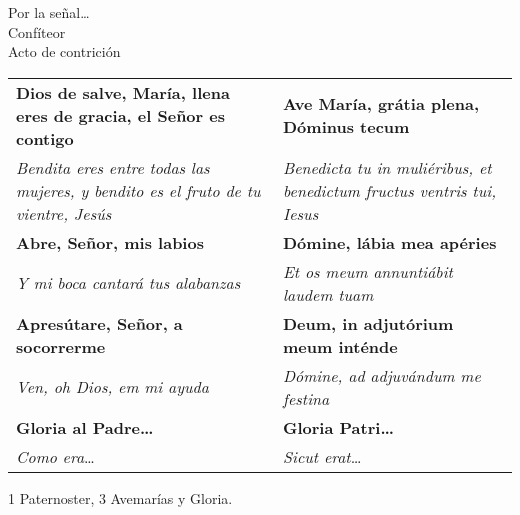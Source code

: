 \documentclass[./devocionario.tex]{subfiles}
\begin{document}
    \begin{center}
        Por la señal{\ldots}\\
        Confíteor\\
        Acto de contrición
    \end{center}

    \begin{longtable} { p{} p{} }
        \textbf{Dios de salve, María, llena eres de gracia, el Señor es contigo} & \textbf{Ave María, grátia plena, Dóminus tecum}\\
        \textit{Bendita eres entre todas las mujeres, y bendito es el fruto de tu vientre, Jesús} & 
        \textit{Benedicta tu in muliéribus, et benedictum fructus ventris tui, Iesus}\\
        \textbf{Abre, Señor, mis labios} & \textbf{Dómine, lábia mea apéries}\\
        \textit{Y mi boca cantará tus alabanzas} & \textit{Et os meum annuntiábit laudem tuam}\\
        \textbf{Apresútare, Señor, a socorrerme} & \textbf{Deum, in adjutórium meum inténde}\\
        \textit{Ven, oh Dios, em mi ayuda} & \textit{Dómine, ad adjuvándum me festina}\\ 
        \textbf{Gloria al Padre{\ldots}} & \textbf{Gloria Patri{\ldots}}\\
        \textit{Como era}{\ldots} & \textit{Sicut erat}{\ldots}\\
    \end{longtable}

    

    \begin{center}
        1 Paternoster, 3 Avemarías y Gloria.
    \end{center}
\end{document}
